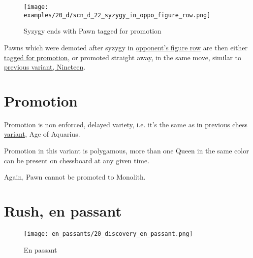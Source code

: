\vspace*{-1.2\baselineskip}
\noindent
\begin{figure}[!h]
\texttt{[image: examples/20\_d/scn\_d\_22\_syzygy\_in\_oppo\_figure\_row.png]}
\caption{Syzygy ends with Pawn tagged for promotion}
\label{fig:scn_d_22_syzygy_in_oppo_figure_row}
\end{figure}

Pawns which were demoted after syzygy in
\hyperref[sec:Terms/Figure row]{opponent's figure row}
are then either \hyperref[sec:Age of Aquarius/Promotion]{tagged for promotion},
or promoted straight away, in the same move, similar to
\hyperref[fig:scn_n_11_teleport_pawns_init]{previous variant, Nineteen}.

\clearpage %

\section*{Promotion}

Promotion is non enforced, delayed variety, i.e. it's the same as in
\hyperref[sec:Age of Aquarius/Promotion]{previous chess variant}, Age of Aquarius.

Promotion in this variant is polygamous, more than one Queen in the same color
can be present on chessboard at any given time.

Again, Pawn cannot be promoted to Monolith.

\clearpage %

\section*{Rush, en passant}

\vspace*{-1.2\baselineskip}
\noindent
\begin{figure}[!h]
\texttt{[image: en\_passants/20\_discovery\_en\_passant.png]}
\caption{En passant}
\label{fig:20_discovery_en_passant}
\end{figure}

